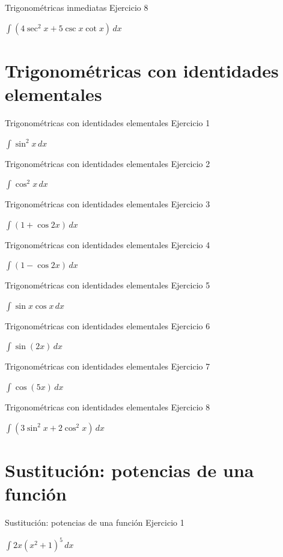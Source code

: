 \documentclass[10pt,aspectratio=169]{beamer}
\newcommand{\ejercicio}[1]{%
  \begin{center}
  \vfill
  {\fontsize{24}{30}\selectfont #1}
  \vfill
  \end{center}
}
\begin{document}
\begin{frame}{Trigonométricas inmediatas}
\small Ejercicio 8
\ejercicio{$\displaystyle \int(4\sec^2x+5\csc x\cot x)\,dx$}
\end{frame}

\section{Trigonométricas con identidades elementales}
\begin{frame}{Trigonométricas con identidades elementales}
\small Ejercicio 1
\ejercicio{$\displaystyle \int\sin^2x\,dx$}
\end{frame}

\begin{frame}{Trigonométricas con identidades elementales}
\small Ejercicio 2
\ejercicio{$\displaystyle \int\cos^2x\,dx$}
\end{frame}

\begin{frame}{Trigonométricas con identidades elementales}
\small Ejercicio 3
\ejercicio{$\displaystyle \int(1+\cos 2x)\,dx$}
\end{frame}

\begin{frame}{Trigonométricas con identidades elementales}
\small Ejercicio 4
\ejercicio{$\displaystyle \int(1-\cos 2x)\,dx$}
\end{frame}

\begin{frame}{Trigonométricas con identidades elementales}
\small Ejercicio 5
\ejercicio{$\displaystyle \int\sin x\cos x\,dx$}
\end{frame}

\begin{frame}{Trigonométricas con identidades elementales}
\small Ejercicio 6
\ejercicio{$\displaystyle \int\sin(2x)\,dx$}
\end{frame}

\begin{frame}{Trigonométricas con identidades elementales}
\small Ejercicio 7
\ejercicio{$\displaystyle \int\cos(5x)\,dx$}
\end{frame}

\begin{frame}{Trigonométricas con identidades elementales}
\small Ejercicio 8
\ejercicio{$\displaystyle \int(3\sin^2x+2\cos^2x)\,dx$}
\end{frame}

\section{Sustitución: potencias de una función}
\begin{frame}{Sustitución: potencias de una función}
\small Ejercicio 1
\ejercicio{$\displaystyle \int 2x(x^2+1)^5\,dx$}
\end{frame}
\end{document}
